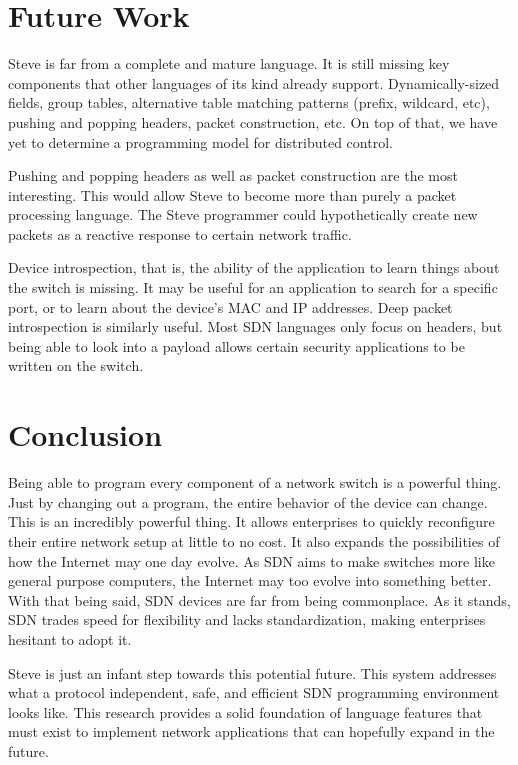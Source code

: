 \section{Future Work}

Steve is far from a complete and mature language. It is still missing key components that other languages of its kind already support. Dynamically-sized fields, group tables, alternative table matching patterns (prefix, wildcard, etc), pushing and popping headers, packet construction, etc. On top of that, we have yet to determine a programming model for distributed control.

Pushing and popping headers as well as packet construction are the most interesting. This would allow Steve to become more than purely a packet processing language. The Steve programmer could hypothetically create new packets as a reactive response to certain network traffic.

Device introspection, that is, the ability of the application to learn things about the switch is missing.
It may be useful for an application to search for a specific port, or to learn about the device's MAC and IP addresses.
Deep packet introspection is similarly useful. Most SDN languages only focus on headers, but being able to look into a payload allows certain security applications to be written on the switch.


\section{Conclusion}

Being able to program every component of a network switch is a powerful thing. Just by changing out a program, the entire behavior of the device can change. This is an incredibly powerful thing. It allows enterprises to quickly reconfigure their entire network setup at little to no cost. It also expands the possibilities of how the Internet may one day evolve. As SDN aims to make switches more like general purpose computers, the Internet may too evolve into something better.
With that being said, SDN devices are far from being commonplace. As it stands, SDN trades speed for flexibility and lacks standardization, making enterprises hesitant to adopt it. 

Steve is just an infant step towards this potential future. This system addresses what a protocol independent, safe, and efficient SDN programming environment looks like. This research provides a solid foundation of language features that must exist to implement network applications that can hopefully expand in the future.